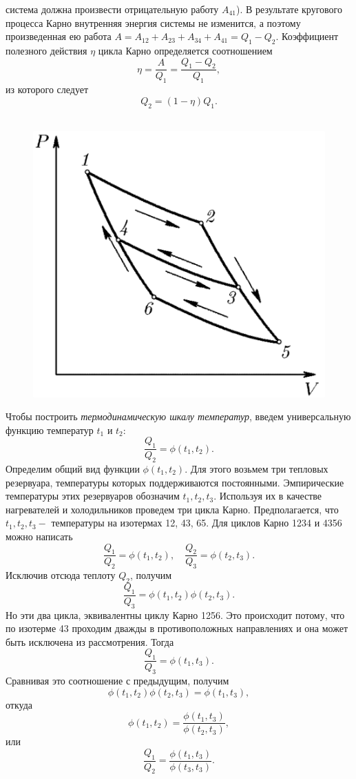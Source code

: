 \documentclass[14pt,a4paper]{scrartcl}
\begin{document}
 		система должна произвести отрицательную работу $A_{41}$). В результате кругового процесса Карно внутренняя энергия системы не изменится, а поэтому произведенная ею работа $A = A_{12} + A_{23} + A_{34} + A_{41} = Q_1 - Q_2$. Коэффициент полезного действия $\eta$ цикла Карно определяется соотношением $$\eta = \dfrac{A}{Q_1} = \dfrac{Q_1-Q_2}{Q_1},$$ из которого следует $$Q_2 = (1-\eta)Q_1.$$\\
		
		\begin{figure} 
			\vspace{-5ex}
			\includegraphics[width=\linewidth]{shkala.png}
		\end{figure}
		\quad Чтобы построить \textit{термодинамическую шкалу температур}, введем универсальную функцию температур $t_1$ и $t_2$: $$\dfrac{Q_1}{Q_2} = \phi(t_1, t_2).$$
		\quad Определим общий вид функции $ \phi(t_1, t_2) $. Для этого возьмем три тепловых резервуара, температуры которых поддерживаются постоянными. Эмпирические температуры этих резервуаров обозначим $t_1, t_2, t_3$. Используя их в качестве нагревателей и холодильников проведем три цикла Карно. Предполагается, что $t_1, t_2, t_3 - $ температуры на изотермах 12, 43, 65. Для циклов Карно 1234 и 4356 можно написать $$\dfrac{Q_1}{Q_2} = \phi(t_1, t_2), \quad \dfrac{Q_2}{Q_3} = \phi(t_2, t_3).$$ Исключив отсюда теплоту $Q_2$, получим $$\dfrac{Q_1}{Q_3} =\phi(t_1, t_2) \phi(t_2, t_3).$$  Но эти два цикла, эквивалентны циклу Карно 1256. Это происходит потому, что по изотерме 43 проходим дважды в противоположных направлениях и она может быть исключена из рассмотрения. Тогда $$\dfrac{Q_1}{Q_3} = \phi(t_1, t_3).$$ Сравнивая это соотношение с предыдущим, получим $$\phi(t_1, t_2)\phi(t_2, t_3) = \phi(t_1, t_3),$$ откуда $$\phi(t_1, t_2) = \dfrac{\phi(t_1, t_3)}{\phi(t_2, t_3)},$$ или  $$\dfrac{Q_1}{Q_2} = \dfrac{\phi(t_1, t_3)}{\phi(t_3, t_3)}.$$ 
		
\end{document}
